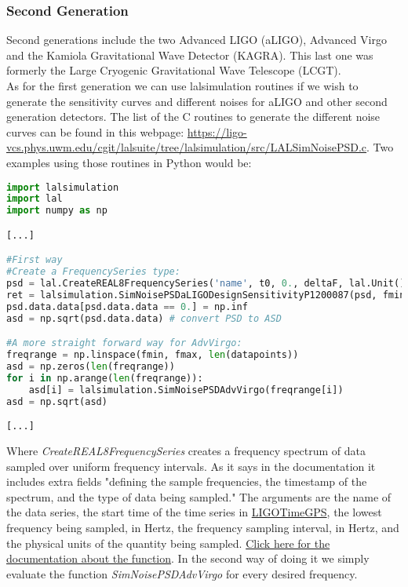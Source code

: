 \documentclass[11pt,fleqn]{book} %
\begin{document}
\subsubsection{Second Generation}
\vspace{.3 cm}


Second generations include the two Advanced LIGO (aLIGO), Advanced Virgo and the Kamiola Gravitational Wave Detector (KAGRA). This last one was formerly the Large Cryogenic Gravitational Wave Telescope (LCGT). \\

As for the first generation we can use lalsimulation routines if we wish to generate the sensitivity curves and different noises for aLIGO and other second generation detectors. The list of the C routines to generate the different noise curves can be found in this webpage: \url{https://ligo-vcs.phys.uwm.edu/cgit/lalsuite/tree/lalsimulation/src/LALSimNoisePSD.c}. Two examples using those routines in Python would be:\\

\begin{lstlisting}[language= Python,style=Python,caption={Noise power spectrum for aLIGO and AdvVirgo},label={lst:psd}]
import lalsimulation
import lal
import numpy as np

[...]

#First way
#Create a FrequencySeries type: 
psd = lal.CreateREAL8FrequencySeries('name', t0, 0., deltaF, lal.Unit(), len(hp)) # to hold psd
ret = lalsimulation.SimNoisePSDaLIGODesignSensitivityP1200087(psd, fmin)
psd.data.data[psd.data.data == 0.] = np.inf
asd = np.sqrt(psd.data.data) # convert PSD to ASD

#A more straight forward way for AdvVirgo:
freqrange = np.linspace(fmin, fmax, len(datapoints))
asd = np.zeros(len(freqrange))
for i in np.arange(len(freqrange)):
	asd[i] = lalsimulation.SimNoisePSDAdvVirgo(freqrange[i])
asd = np.sqrt(asd)

[...]
\end{lstlisting}

Where \emph{CreateREAL8FrequencySeries} creates a frequency spectrum of data sampled over uniform frequency intervals. As it says in the documentation it includes extra fields "defining the sample frequencies, the timestamp of the spectrum, and the type of data being sampled." The arguments are the name of the data series, the start time of the time series in \href{http://software.ligo.org/docs/lalsuite/lal/struct_l_i_g_o_time_g_p_s.html}{LIGOTimeGPS}, the lowest frequency being sampled, in Hertz, the frequency sampling interval, in Hertz, and the physical units of the quantity being sampled. \href{http://software.ligo.org/docs/lalsuite/lal/group___l_a_l_datatypes.html#ss_FrequencySeries}{Click here for the documentation about the function}. In the second way of doing it we simply evaluate the function \emph{SimNoisePSDAdvVirgo} for every desired frequency.
\end{document}
